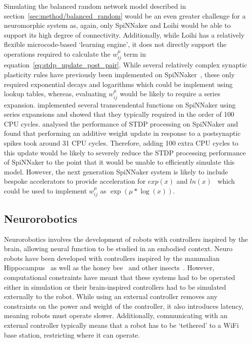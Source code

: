\documentclass[utf8]{frontiersSCNS} %
\begin{document}
Simulating the balanced random network model described in section~\ref{sec:method/balanced_random} would be an even greater challenge for a neuromorphic system as, again, only SpiNNaker and Loihi would be able to support its high degree of connectivity.
Additionally, while Loihi has a relatively flexible microcode-based `learning engine', it does not directly support the operations required to calculate the $w_{ij}^{\mu}$ term in equation~\ref{eq:stdp_update_post_pair}.
While several relatively complex synaptic plasticity rules have previously been implemented on SpiNNaker~\citep{Knight2016,Mikaitis2018b}, these only required exponential decays and logarithms which could be implement using lookup tables, whereas, evaluating $w_{ij}^{\mu}$ would be likely to require a series expansion.
\citet{Moise2012} implemented several transcendental functions on SpiNNaker using series expansions and showed that they typically required in the order of \num{100} CPU cycles.
\citet{Knight2016b} analysed the performance of STDP processing on SpiNNaker and found that performing an additive weight update in response to a postsynaptic spikes took around \num{31} CPU cycles.
Therefore, adding \num{100} extra CPU cycles to this update would be likely to severely reduce the STDP processing performance of SpiNNaker to the point that it would be unable to efficiently simulate this model.
However, the next generation SpiNNaker system is likely to include bespoke accelerators to provide acceleration for $exp(x)$ and $ln(x)$~\citep{Mikaitis2018,Partzsch2017} which could be used to implement $w_{ij}^{\mu}$ as $\exp(\mu * \log(x))$.

\subsection{Neurorobotics}
\label{sec:discussion/neurobotics}
Neurorobotics involves the development of robots with controllers inspired by the brain, allowing neural function to be studied in an embodied context.
Neuro robots have been developed with controllers inspired by the mammalian Hippocampus~\citep{Krichmar2005} as well as the honey bee~\citep{Cope2016} and other insects~\citep{Blanchard2000}.
However, computational constraints have meant that these systems had to be operated either in simulation or their brain-inspired controllers had to be simulated externally to the robot.
While using an external controller removes any constraints on the power and weight of the controller, it also introduces latency, meaning robots must operate slower.
Additionally, communicating with an external controller typically means that a robot has to be `tethered' to a WiFi base station, restricting where it can operate.
\end{document}
